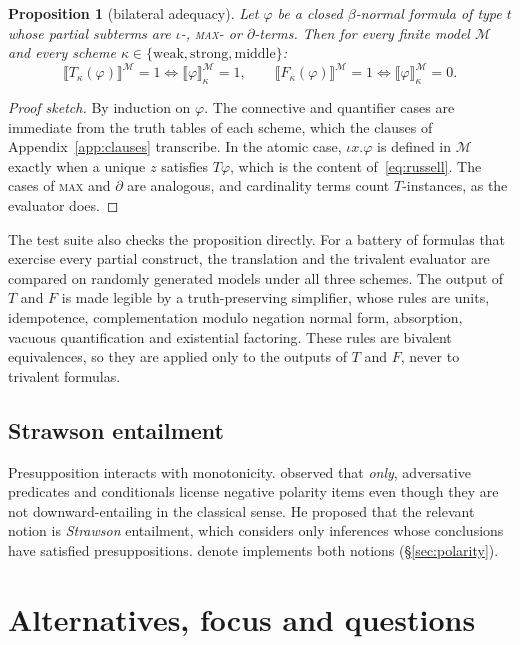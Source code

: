 \documentclass[11pt,a4paper]{article}
\newcommand{\den}[1]{\llbracket #1\rrbracket}
\newcommand{\dn}{\textsf{denote}}
\newtheorem{proposition}{Proposition}
\theoremstyle{definition}
\begin{document}
\begin{proposition}[bilateral adequacy]\label{prop:bilateral}
Let $\varphi$ be a closed $\beta$-normal formula of type $t$ whose partial subterms are $\iota$-, \textsc{max}- or $\partial$-terms. Then for every finite model $\mathcal{M}$ and every scheme $\kappa\in\{\text{weak},\text{strong},\text{middle}\}$:
\[
\den{T_\kappa(\varphi)}^{\mathcal{M}}=1\iff\den{\varphi}^{\mathcal{M}}_\kappa=1,\qquad
\den{F_\kappa(\varphi)}^{\mathcal{M}}=1\iff\den{\varphi}^{\mathcal{M}}_\kappa=0.
\]
\end{proposition}
\begin{proof}[Proof sketch]
By induction on $\varphi$. The connective and quantifier cases are immediate from the truth tables of each scheme, which the clauses of Appendix~\ref{app:clauses} transcribe. In the atomic case, $\iota x.\varphi$ is defined in $\mathcal{M}$ exactly when a unique $z$ satisfies $T\varphi$, which is the content of~\eqref{eq:russell}. The cases of \textsc{max} and $\partial$ are analogous, and cardinality terms count $T$-instances, as the evaluator does.
\end{proof}

\noindent The test suite also checks the proposition directly. For a battery of formulas that exercise every partial construct, the translation and the trivalent evaluator are compared on randomly generated models under all three schemes. The output of $T$ and $F$ is made legible by a truth-preserving simplifier, whose rules are units, idempotence, complementation modulo negation normal form, absorption, vacuous quantification and existential factoring. These rules are bivalent equivalences, so they are applied only to the outputs of $T$ and $F$, never to trivalent formulas.

\subsection{Strawson entailment}
Presupposition interacts with monotonicity. \citet{vonfintel1999} observed that \textit{only}, adversative predicates and conditionals license negative polarity items even though they are not downward-entailing in the classical sense. He proposed that the relevant notion is \emph{Strawson} entailment, which considers only inferences whose conclusions have satisfied presuppositions. \dn{} implements both notions (\S\ref{sec:polarity}).

\section{Alternatives, focus and questions}\label{sec:focus}
\end{document}
